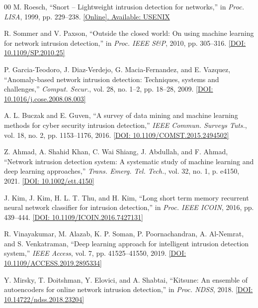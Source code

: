 \documentclass[conference]{IEEEtran}
\begin{document}
\begin{thebibliography}{00}
M. Roesch, ``Snort -- Lightweight intrusion detection for networks,'' in \textit{Proc. LISA}, 1999, pp. 229--238. \href{https://www.usenix.org/conference/lisa-1999/snort-lightweight-intrusion-detection-networks}{[Online]. Available: USENIX}

R. Sommer and V. Paxson, ``Outside the closed world: On using machine learning for network intrusion detection,'' in \textit{Proc. IEEE S\&P}, 2010, pp. 305--316. \href{https://doi.org/10.1109/SP.2010.25}{[DOI: 10.1109/SP.2010.25]}

P. Garcia-Teodoro, J. Diaz-Verdejo, G. Macia-Fernandez, and E. Vazquez, ``Anomaly-based network intrusion detection: Techniques, systems and challenges,'' \textit{Comput. Secur.}, vol. 28, no. 1--2, pp. 18--28, 2009. \href{https://doi.org/10.1016/j.cose.2008.08.003}{[DOI: 10.1016/j.cose.2008.08.003]}

A. L. Buczak and E. Guven, ``A survey of data mining and machine learning methods for cyber security intrusion detection,'' \textit{IEEE Commun. Surveys Tuts.}, vol. 18, no. 2, pp. 1153--1176, 2016. \href{https://doi.org/10.1109/COMST.2015.2494502}{[DOI: 10.1109/COMST.2015.2494502]}

Z. Ahmad, A. Shahid Khan, C. Wai Shiang, J. Abdullah, and F. Ahmad, ``Network intrusion detection system: A systematic study of machine learning and deep learning approaches,'' \textit{Trans. Emerg. Tel. Tech.}, vol. 32, no. 1, p. e4150, 2021. \href{https://doi.org/10.1002/ett.4150}{[DOI: 10.1002/ett.4150]}

J. Kim, J. Kim, H. L. T. Thu, and H. Kim, ``Long short term memory recurrent neural network classifier for intrusion detection,'' in \textit{Proc. IEEE ICOIN}, 2016, pp. 439--444. \href{https://doi.org/10.1109/ICOIN.2016.7427131}{[DOI: 10.1109/ICOIN.2016.7427131]}

R. Vinayakumar, M. Alazab, K. P. Soman, P. Poornachandran, A. Al-Nemrat, and S. Venkatraman, ``Deep learning approach for intelligent intrusion detection system,'' \textit{IEEE Access}, vol. 7, pp. 41525--41550, 2019. \href{https://doi.org/10.1109/ACCESS.2019.2895334}{[DOI: 10.1109/ACCESS.2019.2895334]}

Y. Mirsky, T. Doitshman, Y. Elovici, and A. Shabtai, ``Kitsune: An ensemble of autoencoders for online network intrusion detection,'' in \textit{Proc. NDSS}, 2018. \href{https://doi.org/10.14722/ndss.2018.23204}{[DOI: 10.14722/ndss.2018.23204]}


\end{thebibliography}
\end{document}
